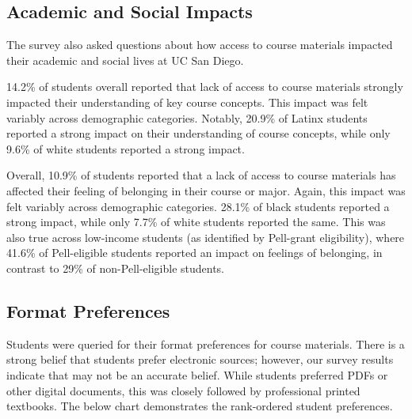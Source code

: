 \documentclass[
  letterpaper,
  DIV=11,
  numbers=noendperiod]{scrreprt}
\begin{document}
\hypertarget{academic-and-social-impacts}{%
\subsection{Academic and Social
Impacts}\label{academic-and-social-impacts}}

The survey also asked questions about how access to course materials
impacted their academic and social lives at UC San Diego.

14.2\% of students overall reported that lack of access to course
materials strongly impacted their understanding of key course concepts.
This impact was felt variably across demographic categories. Notably,
20.9\% of Latinx students reported a strong impact on their
understanding of course concepts, while only 9.6\% of white students
reported a strong impact.

Overall, 10.9\% of students reported that a lack of access to course
materials has affected their feeling of belonging in their course or
major. Again, this impact was felt variably across demographic
categories. 28.1\% of black students reported a strong impact, while
only 7.7\% of white students reported the same. This was also true
across low-income students (as identified by Pell-grant eligibility),
where 41.6\% of Pell-eligible students reported an impact on feelings of
belonging, in contrast to 29\% of non-Pell-eligible students.

\hypertarget{format-preferences}{%
\subsection{Format Preferences}\label{format-preferences}}

Students were queried for their format preferences for course materials.
There is a strong belief that students prefer electronic sources;
however, our survey results indicate that may not be an accurate belief.
While students preferred PDFs or other digital documents, this was
closely followed by professional printed textbooks. The below chart
demonstrates the rank-ordered student preferences.
\end{document}

